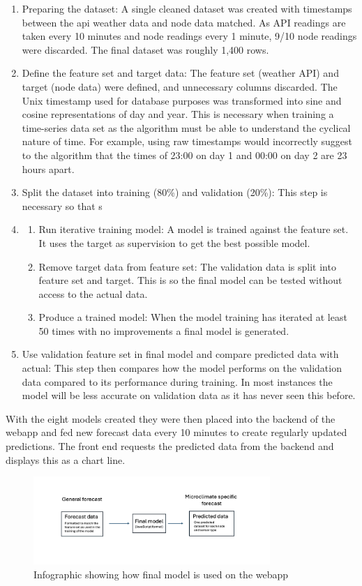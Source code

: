 \begin{enumerate}
    \item Preparing the dataset: A single cleaned dataset was created with
    timestamps between the api weather data and node data matched. As API
    readings are taken every 10 minutes and node readings every 1 minute, 9/10
    node readings were discarded. The final dataset was roughly 1,400 rows.
    \item Define the feature set and target data:  
    The feature set (weather API) and target (node data) were defined, and
    unnecessary columns discarded. The Unix timestamp used for database purposes
    was transformed into sine and cosine representations of day and year. This
    is necessary when training a time-series data set as the algorithm must be
    able to understand the cyclical nature of time.  
    For example, using raw timestamps would incorrectly suggest to the algorithm
    that the times of 23:00 on day 1 and 00:00 on day 2 are 23 hours apart.
    \item Split the dataset into training (80\%) and validation (20\%): This
    step is necessary so that s
    \item
        \begin{enumerate}
            \item Run iterative training model: A model is trained against the
            feature set. It uses the target as supervision to get the best
            possible model.
            \item Remove target data from feature set: The validation data is
            split into feature set and target. This is so the final model can be
            tested without access to the actual data.
            \item Produce a trained model: When the model training has iterated
            at least 50 times with no improvements a final model is generated.
        \end{enumerate}
    \item Use validation feature set in final model and compare predicted data
    with actual: This step then compares how the model performs on the
    validation data compared to its performance during training. In most
    instances the model will be less accurate on validation data as it has never
    seen this before.
\end{enumerate}

With the eight models created they were then placed into the backend of the
webapp and fed new forecast data every 10 minutes to create regularly updated
predictions. The front end requests the predicted data from the backend and
displays this as a chart line.

\begin{figure}[H]
    \centering
    \includegraphics[width=0.8\textwidth]{contents/part-3/fig3/model_diagram.png}
    \caption{Infographic showing how final model is used on the webapp}
    \label{fig:model_diagram}
\end{figure}

